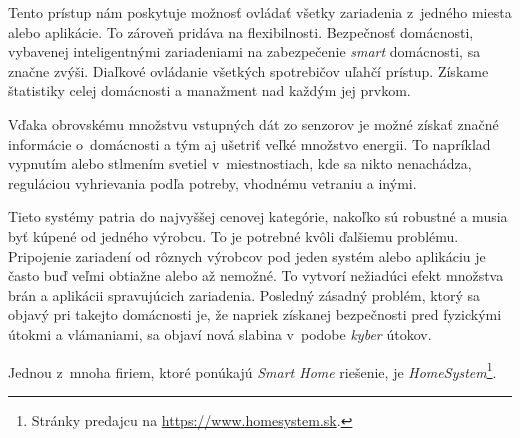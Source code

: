 Tento prístup nám poskytuje možnosť ovládať všetky zariadenia z~jedného miesta alebo aplikácie. 
To zároveň pridáva na flexibilnosti.
Bezpečnosť domácnosti, vybavenej inteligentnými zariadeniami na zabezpečenie \emph{smart} domácnosti, sa značne zvýši. 
Diaľkové ovládanie všetkých spotrebičov uľahčí prístup. 
Získame štatistiky celej domácnosti a manažment nad každým jej prvkom.~\cite{smart_home}

Vďaka obrovskému množstvu vstupných dát zo senzorov je možné získať značné informácie o~domácnosti a tým aj ušetriť veľké množstvo energii. 
To napríklad vypnutím alebo stlmením svetiel v~miestnostiach, kde sa nikto nenachádza, reguláciou vyhrievania podľa potreby, vhodnému vetraniu a inými.

Tieto systémy patria do najvyššej cenovej kategórie, nakoľko sú robustné a musia byť kúpené od jedného výrobcu. 
To je potrebné kvôli ďalšiemu problému. 
Pripojenie zariadení od rôznych výrobcov pod jeden systém alebo aplikáciu je často buď veľmi obtiažne alebo až nemožné. 
To vytvorí nežiadúci efekt množstva brán a aplikácii spravujúcich zariadenia. 
Posledný zásadný problém, ktorý sa objavý pri takejto domácnosti je, že napriek získanej bezpečnosti pred fyzickými útokmi a vlámaniami, sa objaví nová slabina v~podobe \emph{kyber} útokov.~\cite{dissmart}

Jednou z~mnoha firiem, ktoré ponúkajú \emph{Smart Home} riešenie, je \textit{HomeSystem}\footnote{Stránky predajcu na \url{https://www.homesystem.sk}.}.

